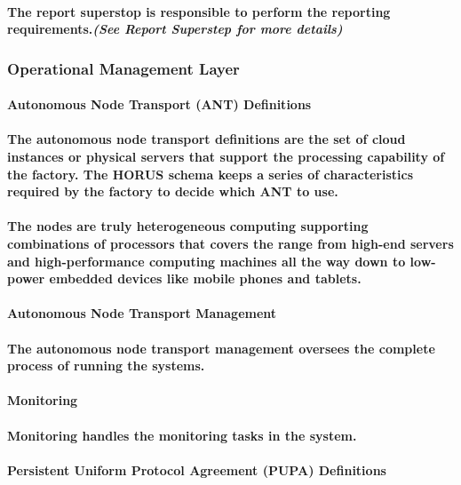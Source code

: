 \documentclass{acm_proc_article-sp}
\begin{document}
\paragraph{The report superstop is responsible to perform the reporting requirements.\textit{(See Report Superstep for more details)}}
\subsubsection{Operational Management Layer}
\paragraph{\textbf{Autonomous Node Transport (ANT) Definitions}}
\paragraph{The autonomous node transport definitions are the set of cloud instances or physical servers that support the processing capability of the factory. The HORUS schema keeps a series of characteristics required by the factory to decide which ANT to use.}
\paragraph{The nodes are truly heterogeneous computing supporting combinations of processors that covers the range from high-end servers and high-performance computing machines all the way down to low-power embedded devices like mobile phones and tablets.}
\paragraph{\textbf{Autonomous Node Transport Management}}
\paragraph{The autonomous node transport management oversees the complete process of running the systems.}
\paragraph{\textbf{Monitoring}}
\paragraph{Monitoring handles the monitoring tasks in the system.}
\paragraph{\textbf{Persistent Uniform Protocol Agreement (PUPA) Definitions}}
\end{document}
